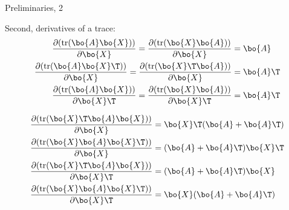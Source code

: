 \documentclass{beamer}
\begin{document}
\begin{frame}{Preliminaries, 2}
	\begin{flushleft}
		
		Second, derivatives of a trace:
		\begin{align}
			\frac{\partial ( \text{tr}(\bo{A} \bo{X}) )}{\partial \bo{X}} = 
			\frac{\partial ( \text{tr}(\bo{X}\bo{A}) )}{\partial \bo{X}} 
			&= 
			\bo{A}
			\\
			\frac{\partial ( \text{tr}(\bo{A} \bo{X}\T) )}{\partial \bo{X}} = 
			\frac{\partial ( \text{tr}(\bo{X}\T\bo{A}) )}{\partial \bo{X}} 
			&= 
			\bo{A}\T	
			\\
			\frac{\partial ( \text{tr}(\bo{A} \bo{X}) )}{\partial \bo{X}\T} = 
			\frac{\partial ( \text{tr}(\bo{X}\bo{A}) )}{\partial \bo{X}\T} 
			&= 
			\bo{A}\T		
		\end{align}
	
		\begin{align}
			\frac{\partial ( \text{tr}(\bo{X}\T \bo{A} \bo{X}) )}{\partial \bo{X}} 
			&=
			 \bo{X}\T (\bo{A} + \bo{A}\T)
			 \\
			 \frac{\partial ( \text{tr}(\bo{X} \bo{A} \bo{X}\T) )}{\partial \bo{X}} 
			 &=
			  (\bo{A} + \bo{A}\T) \bo{X}\T
			 \\
			 \frac{\partial ( \text{tr}(\bo{X}\T \bo{A} \bo{X}) )}{\partial \bo{X}\T} 
			 &=
			 (\bo{A} + \bo{A}\T) \bo{X}
			 \\
			 \frac{\partial ( \text{tr}(\bo{X} \bo{A} \bo{X}\T) )}{\partial \bo{X}\T} 
			 &=
			 \bo{X}(\bo{A} + \bo{A}\T)
		\end{align}
		
			
		
	\end{flushleft}
\end{frame}
\end{document}
